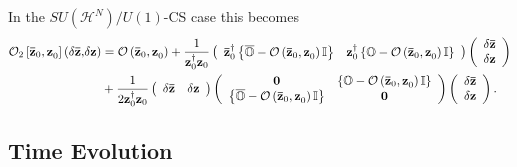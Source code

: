 \documentclass[aps,preprint]{revtex4}%
\begin{document}
In the $SU\left(  \mathcal{H}^{N}\right)  /U\left(  1\right)  $-CS case this
becomes
\begin{align}
\mathcal{O}_{2}\left[  \mathbf{\bar{z}}_{0}\mathbf{,z}_{0}\right]  \left(
\delta\mathbf{\bar{z},}\delta\mathbf{z}\right)   &  =\mathcal{O}\left(
\mathbf{\bar{z}}_{0}\mathbf{,z}_{0}\right)  +\frac{1}{\mathbf{z}_{0}^{\dagger
}\mathbf{z}_{0}}\left(
\begin{array}
[c]{cc}%
\mathbf{\bar{z}}_{0}^{\dagger}\left\{  \overline{\mathbb{O}}-\mathcal{O}%
\left(  \mathbf{\bar{z}}_{0}\mathbf{,z}_{0}\right)  \mathbb{I}\right\}  &
\mathbf{z}_{0}^{\dagger}\left\{  \mathbb{O}-\mathcal{O}\left(  \mathbf{\bar
{z}}_{0}\mathbf{,z}_{0}\right)  \mathbb{I}\right\}
\end{array}
\right)  \left(
\begin{array}
[c]{c}%
\delta\mathbf{\bar{z}}\\
\delta\mathbf{z}%
\end{array}
\right) \\
&  +\frac{1}{2\mathbf{z}_{0}^{\dagger}\mathbf{z}_{0}}\left(
\begin{array}
[c]{cc}%
\delta\mathbf{\bar{z}} & \delta\mathbf{z}%
\end{array}
\right)  \left(
\begin{array}
[c]{cc}%
\mathbf{0} & \left\{  \mathbb{O}-\mathcal{O}\left(  \mathbf{\bar{z}}%
_{0}\mathbf{,z}_{0}\right)  \mathbb{I}\right\} \\
\left\{  \overline{\mathbb{O}}-\mathcal{O}\left(  \mathbf{\bar{z}}%
_{0}\mathbf{,z}_{0}\right)  \mathbb{I}\right\}  & \mathbf{0}%
\end{array}
\right)  \left(
\begin{array}
[c]{c}%
\delta\mathbf{\bar{z}}\\
\delta\mathbf{z}%
\end{array}
\right)  .
\end{align}


\subsection{Time Evolution}
\end{document}
